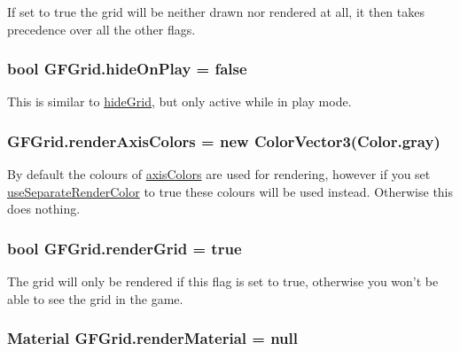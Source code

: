 If set to {\ttfamily true} the grid will be neither drawn nor rendered at all, it then takes precedence over all the other flags.\hypertarget{class_g_f_grid_a9a57a01347c8ab0a6401aa210f875ab0_a9a57a01347c8ab0a6401aa210f875ab0}{
\subsubsection[{hide\+On\+Play}]{\setlength{\rightskip}{0pt plus 5cm}bool G\+F\+Grid.\+hide\+On\+Play = false}}\label{class_g_f_grid_a9a57a01347c8ab0a6401aa210f875ab0_a9a57a01347c8ab0a6401aa210f875ab0}
This is similar to \hyperlink{class_g_f_grid_afa8a9e01aac581a365606ac8c1b4af64_afa8a9e01aac581a365606ac8c1b4af64}{hide\+Grid}, but only active while in play mode. \hypertarget{class_g_f_grid_a8a822dbae0fa74657a7beed9761a0e89_a8a822dbae0fa74657a7beed9761a0e89}{
\subsubsection[{render\+Axis\+Colors}]{ G\+F\+Grid.\+render\+Axis\+Colors = new {\bf Color\+Vector3}(Color.\+gray)}}\label{class_g_f_grid_a8a822dbae0fa74657a7beed9761a0e89_a8a822dbae0fa74657a7beed9761a0e89}
By default the colours of \hyperlink{class_g_f_grid_aa0dc7222dee5910e8df47e133f719309_aa0dc7222dee5910e8df47e133f719309}{axis\+Colors} are used for rendering, however if you set \hyperlink{class_g_f_grid_aeb78dcbc2890d20556958c994b95b000_aeb78dcbc2890d20556958c994b95b000}{use\+Separate\+Render\+Color} to {\ttfamily true} these colours will be used instead. Otherwise this does nothing. \hypertarget{class_g_f_grid_a8b33c2e0823730157804456f4ffb51ed_a8b33c2e0823730157804456f4ffb51ed}{
\subsubsection[{render\+Grid}]{\setlength{\rightskip}{0pt plus 5cm}bool G\+F\+Grid.\+render\+Grid = true}}\label{class_g_f_grid_a8b33c2e0823730157804456f4ffb51ed_a8b33c2e0823730157804456f4ffb51ed}
The grid will only be rendered if this flag is set to {\ttfamily true}, otherwise you won't be able to see the grid in the game. \hypertarget{class_g_f_grid_a5a840197e72fa8b32fb905cc2a9a4d4a_a5a840197e72fa8b32fb905cc2a9a4d4a}{
\subsubsection[{render\+Material}]{\setlength{\rightskip}{0pt plus 5cm}Material G\+F\+Grid.\+render\+Material = null}}\label{class_g_f_grid_a5a840197e72fa8b32fb905cc2a9a4d4a_a5a840197e72fa8b32fb905cc2a9a4d4a}

